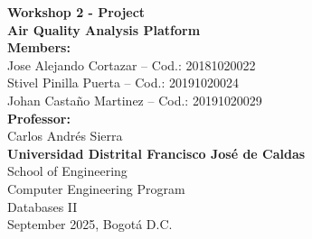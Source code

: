 \documentclass[12pt]{article}
\begin{document}
\begin{titlepage}
    \centering
    \vspace*{1cm}
    
    \Huge
    \textbf{Workshop 2 - Project}\\[0.5cm]
    
    \LARGE
    \textbf{Air Quality Analysis Platform}\\[2cm]
    
    \Large
    \textbf{Members:}\\[0.5cm]
    Jose Alejando Cortazar – Cod.: 20181020022\\
    Stivel Pinilla Puerta – Cod.: 20191020024\\
    Johan Castaño Martinez – Cod.: 20191020029\\[2cm]
    
    \textbf{Professor:}\\[0.5cm]
    Carlos Andrés Sierra\\[2cm]
    
    \textbf{Universidad Distrital Francisco José de Caldas}\\
    School of Engineering\\
    Computer Engineering Program\\
    Databases II\\[2cm]
    
    September 2025, Bogotá D.C.
\end{titlepage}

\newpage

\tableofcontents
\newpage









% 
% 
% 


\end{document}
